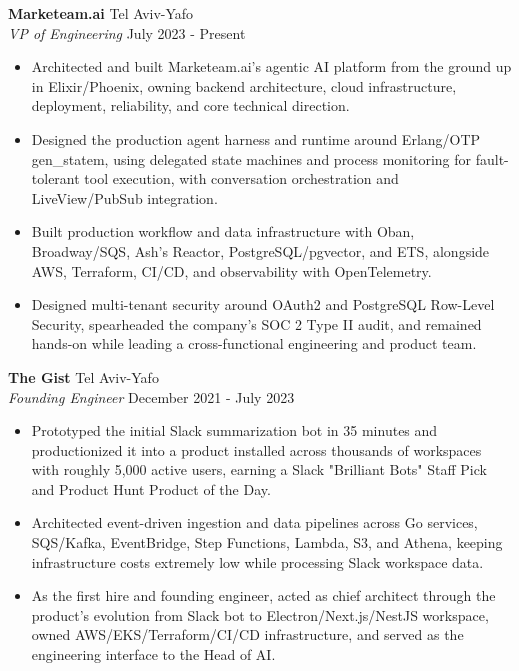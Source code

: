 \documentclass[a4paper]{article}
\begin{document}
\textbf{Marketeam.ai} \hfill Tel Aviv-Yafo\\
\textit{VP of Engineering} \hfill July 2023 - Present\\
\vspace{-1mm}
\begin{itemize} \itemsep 1pt
	\item Architected and built Marketeam.ai's agentic AI platform from the ground up in Elixir/Phoenix, owning backend architecture, cloud infrastructure, deployment, reliability, and core technical direction.
	\item Designed the production agent harness and runtime around Erlang/OTP gen\_statem, using delegated state machines and process monitoring for fault-tolerant tool execution, with conversation orchestration and LiveView/PubSub integration.
	\item Built production workflow and data infrastructure with Oban, Broadway/SQS, Ash's Reactor, PostgreSQL/pgvector, and ETS, alongside AWS, Terraform, CI/CD, and observability with OpenTelemetry.
	\item Designed multi-tenant security around OAuth2 and PostgreSQL Row-Level Security, spearheaded the company's SOC 2 Type II audit, and remained hands-on while leading a cross-functional engineering and product team.
\end{itemize}
\textbf{The Gist} \hfill Tel Aviv-Yafo\\
\textit{Founding Engineer} \hfill December 2021 - July 2023\\
\vspace{-1mm}
\begin{itemize} \itemsep 1pt
	\item Prototyped the initial Slack summarization bot in 35 minutes and productionized it into a product installed across thousands of workspaces with roughly 5,000 active users, earning a Slack "Brilliant Bots" Staff Pick and Product Hunt Product of the Day.
	\item Architected event-driven ingestion and data pipelines across Go services, SQS/Kafka, EventBridge, Step Functions, Lambda, S3, and Athena, keeping infrastructure costs extremely low while processing Slack workspace data.
	\item As the first hire and founding engineer, acted as chief architect through the product's evolution from Slack bot to Electron/Next.js/NestJS workspace, owned AWS/EKS/Terraform/CI/CD infrastructure, and served as the engineering interface to the Head of AI.
\end{itemize}
\end{document}
